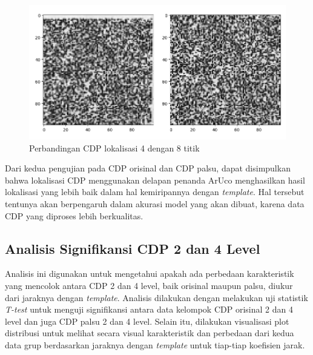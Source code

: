\begin{figure}[h]
	\centering
	\includegraphics[width=12cm]{contents/chapter-4/4-cdplokalisasi8vs4.png}
	\caption{Perbandingan CDP lokalisasi 4 dengan 8 titik}
	\label{Fig: 4-cdplokalisasi8vs4}
\end{figure}

Dari kedua pengujian pada CDP orisinal dan CDP palsu, dapat disimpulkan bahwa lokalisasi CDP menggunakan delapan penanda ArUco menghasilkan hasil lokalisasi
yang lebih baik dalam hal kemiripannya dengan \emph{template}. Hal tersebut tentunya akan berpengaruh dalam akurasi model yang akan dibuat, karena data CDP
yang diproses lebih berkualitas.

\subsection{Analisis Signifikansi CDP 2 dan 4 Level}
Analisis ini digunakan untuk mengetahui apakah ada perbedaan karakteristik yang mencolok antara CDP 2 dan 4 level, baik orisinal maupun palsu, diukur dari
jaraknya dengan \emph{template}. Analisis dilakukan dengan melakukan uji statistik \emph{T-test} untuk menguji signifikansi antara data kelompok CDP orisinal 2
dan 4 level dan juga CDP palsu 2 dan 4 level. Selain itu, dilakukan visualisasi plot distribusi untuk melihat secara visual karakteristik dan perbedaan dari
kedua data grup berdasarkan jaraknya dengan \emph{template} untuk tiap-tiap koefisien jarak.

